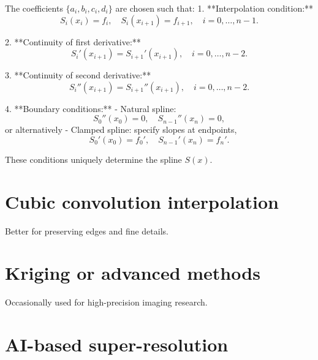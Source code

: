 The coefficients $\{a_i,b_i,c_i,d_i\}$ are chosen such that:
1. **Interpolation condition:**
   \[
   S_i(x_i) = f_i, 
   \quad S_i(x_{i+1}) = f_{i+1}, 
   \quad i=0,\dots,n-1.
   \]

2. **Continuity of first derivative:**
   \[
   S_i'(x_{i+1}) = S_{i+1}'(x_{i+1}), 
   \quad i=0,\dots,n-2.
   \]

3. **Continuity of second derivative:**
   \[
   S_i''(x_{i+1}) = S_{i+1}''(x_{i+1}), 
   \quad i=0,\dots,n-2.
   \]

4. **Boundary conditions:**
   - Natural spline: 
     \[
     S_0''(x_0) = 0, \quad S_{n-1}''(x_n) = 0,
     \]
     or alternatively
   - Clamped spline: specify slopes at endpoints,
     \[
     S_0'(x_0) = f_0', \quad S_{n-1}'(x_n) = f_n'.
     \]

These conditions uniquely determine the spline $S(x)$.

\section{Cubic convolution interpolation}

Better for preserving edges and fine details.

\section{Kriging or advanced methods}

Occasionally used for high-precision imaging research.

\section{AI-based super-resolution}